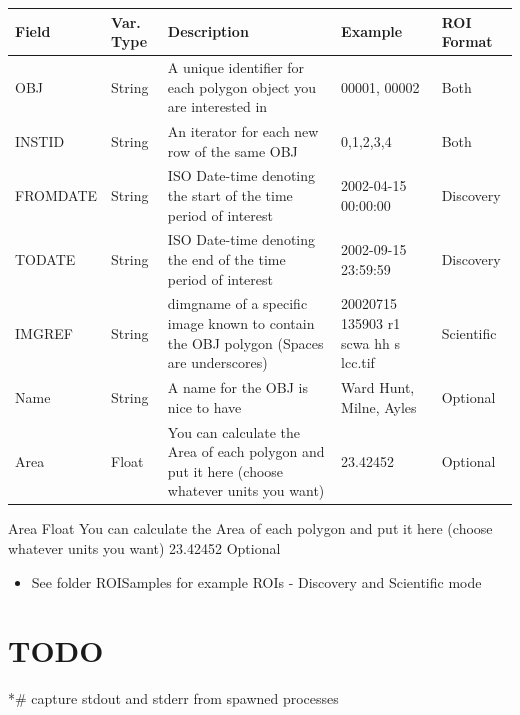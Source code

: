 \documentclass[letterpaper,10pt,openany,oneside]{sphinxmanual}
\begin{document}
\begin{tabulary}{\linewidth}{|L|L|L|L|L|}
\hline
\textsf{\relax 
Field
} & \textsf{\relax 
Var. Type
} & \textsf{\relax 
Description
} & \textsf{\relax 
Example
} & \textsf{\relax 
ROI Format
}\\
\hline
\textbar{} OBJ
 & 
String
 & 
A unique identifier for each polygon object you are interested in
 & 
00001, 00002
 & 
Both
\\
\hline
\textbar{} INSTID
 & 
String
 & 
An iterator for each new row of the same OBJ
 & 
0,1,2,3,4
 & 
Both
\\
\hline
\textbar{} FROMDATE
 & 
String
 & 
ISO Date-time denoting the start of the time period of interest
 & 
2002-04-15 00:00:00
 & 
Discovery
\\
\hline
\textbar{} TODATE
 & 
String
 & 
ISO Date-time denoting the end of the time period of interest
 & 
2002-09-15 23:59:59
 & 
Discovery
\\
\hline
\textbar{} IMGREF
 & 
String
 & 
dimgname of a specific image known to contain the OBJ polygon (Spaces are underscores)
 & 
20020715 135903 r1 scwa  hh s lcc.tif
 & 
Scientific
\\
\hline
\textbar{} Name
 & 
String
 & 
A name for the OBJ is nice to have
 & 
Ward Hunt, Milne, Ayles
 & 
Optional
\\
\hline
\textbar{} Area
 & 
Float
 & 
You can calculate the Area of each polygon and put it here (choose whatever units you want)
 & 
23.42452
 & 
Optional
\\
\hline\end{tabulary}


\begin{DUlineblock}{0em}
\item[] \textbar{} Area       \textbar{} Float      \textbar{} You can calculate the Area of each polygon and put it here (choose whatever units you want)           \textbar{} 23.42452                                       \textbar{} Optional     \textbar{}
\end{DUlineblock}
\begin{itemize}
\item {} 
See folder ROISamples for example ROIs - Discovery and Scientific
mode

\end{itemize}


\chapter{TODO}
\label{project:todo}
*\# capture stdout and stderr from spawned processes
\end{document}
